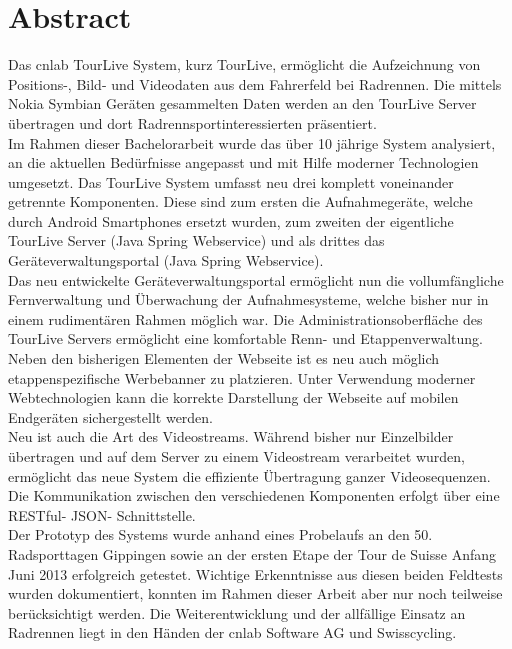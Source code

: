 \chapter*{Abstract}
Das cnlab TourLive System, kurz TourLive, ermöglicht die Aufzeichnung von Positions-, Bild- und Videodaten aus dem Fahrerfeld bei Radrennen. Die mittels Nokia Symbian Geräten gesammelten Daten werden an den TourLive Server übertragen und dort Radrennsportinteressierten präsentiert.
\\

Im Rahmen dieser Bachelorarbeit wurde das über 10 jährige System analysiert, an die aktuellen Bedürfnisse angepasst und mit Hilfe moderner Technologien umgesetzt. Das TourLive System umfasst neu drei komplett voneinander getrennte Komponenten. Diese sind zum ersten die Aufnahmegeräte, welche durch Android Smartphones ersetzt wurden, zum zweiten der eigentliche TourLive Server (Java Spring Webservice) und als drittes das Geräteverwaltungsportal (Java Spring Webservice). 
\\

Das neu entwickelte Geräteverwaltungsportal ermöglicht nun die vollumfängliche Fernverwaltung und Überwachung der Aufnahmesysteme, welche bisher nur in einem rudimentären Rahmen möglich war. Die Administrationsoberfläche des TourLive Servers ermöglicht eine komfortable Renn- und Etappenverwaltung. Neben den bisherigen Elementen der Webseite ist es neu auch möglich etappenspezifische Werbebanner zu platzieren. Unter Verwendung moderner Webtechnologien kann die korrekte  Darstellung der Webseite auf mobilen Endgeräten sichergestellt werden.
\\

Neu ist auch die Art des Videostreams. Während bisher nur Einzelbilder übertragen und auf dem Server zu einem Videostream verarbeitet wurden, ermöglicht das neue System die effiziente Übertragung ganzer Videosequenzen. Die Kommunikation zwischen den verschiedenen Komponenten erfolgt über eine RESTful- JSON- Schnittstelle. 
\\

Der Prototyp des Systems wurde anhand eines Probelaufs an den 50. Radsporttagen Gippingen sowie an der ersten Etape der Tour de Suisse Anfang Juni 2013 erfolgreich getestet. Wichtige Erkenntnisse aus diesen beiden Feldtests wurden dokumentiert, konnten im Rahmen dieser Arbeit aber nur noch teilweise berücksichtigt werden. Die Weiterentwicklung und der allfällige Einsatz an Radrennen liegt in den Händen der cnlab Software AG und Swisscycling.
